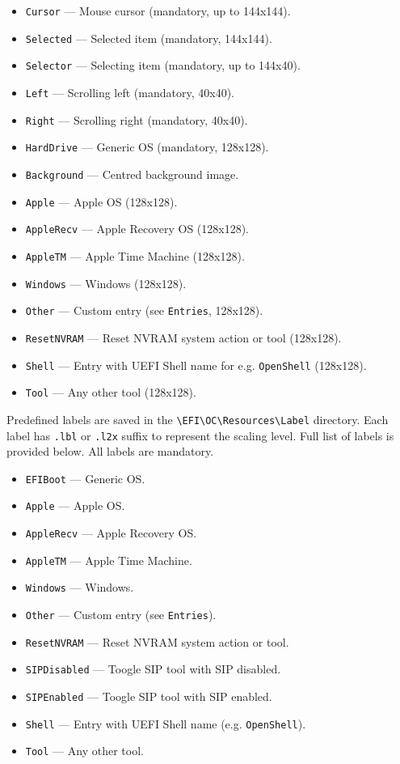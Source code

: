 \documentclass[]{article}
\providecommand{\tightlist}{%
  \setlength{\itemsep}{0pt}\setlength{\parskip}{0pt}}
\begin{document}
\begin{itemize}
\tightlist
  \item \texttt{Cursor} --- Mouse cursor (mandatory, up to 144x144).
  \item \texttt{Selected} --- Selected item (mandatory, 144x144).
  \item \texttt{Selector} --- Selecting item (mandatory, up to 144x40).
  \item \texttt{Left} --- Scrolling left (mandatory, 40x40).
  \item \texttt{Right} --- Scrolling right (mandatory, 40x40).
  \item \texttt{HardDrive} --- Generic OS (mandatory, 128x128).
  \item \texttt{Background} --- Centred background image.
  \item \texttt{Apple} --- Apple OS (128x128).
  \item \texttt{AppleRecv} --- Apple Recovery OS (128x128).
  \item \texttt{AppleTM} --- Apple Time Machine (128x128).
  \item \texttt{Windows} --- Windows (128x128).
  \item \texttt{Other} --- Custom entry (see \texttt{Entries}, 128x128).
  \item \texttt{ResetNVRAM} --- Reset NVRAM system action or tool (128x128).
  \item \texttt{Shell} --- Entry with UEFI Shell name for e.g. \texttt{OpenShell} (128x128).
  \item \texttt{Tool} --- Any other tool (128x128).
\end{itemize}

Predefined labels are saved in the
\texttt{\textbackslash EFI\textbackslash OC\textbackslash Resources\textbackslash Label}
directory. Each label has \texttt{.lbl} or \texttt{.l2x} suffix to represent the scaling level.
Full list of labels is provided below. All labels are mandatory.

\begin{itemize}
\tightlist
  \item \texttt{EFIBoot} --- Generic OS.
  \item \texttt{Apple} --- Apple OS.
  \item \texttt{AppleRecv} --- Apple Recovery OS.
  \item \texttt{AppleTM} --- Apple Time Machine.
  \item \texttt{Windows} --- Windows.
  \item \texttt{Other} --- Custom entry (see \texttt{Entries}).
  \item \texttt{ResetNVRAM} --- Reset NVRAM system action or tool.
  \item \texttt{SIPDisabled} --- Toogle SIP tool with SIP disabled.
  \item \texttt{SIPEnabled} --- Toogle SIP tool with SIP enabled.
  \item \texttt{Shell} --- Entry with UEFI Shell name (e.g. \texttt{OpenShell}).
  \item \texttt{Tool} --- Any other tool.
\end{itemize}
\end{document}
